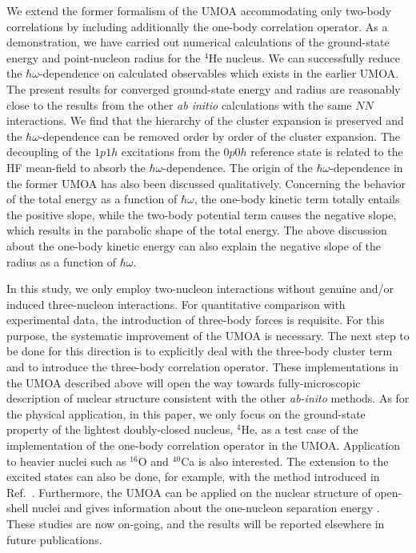 \documentclass[aps,prc, dvips, twocolumn,groupedaddress,showkeys,showpacs,floatfix,superscriptaddress]{revtex4-1}
\newcommand{\<}{\langle}
\renewcommand{\>}{\rangle}
\begin{document}
We extend the former formalism of the UMOA accommodating only two-body correlations
by including additionally the one-body correlation operator.
As a demonstration, we have carried out numerical calculations
of the ground-state energy and point-nucleon radius for the $^{4}$He nucleus.
We can successfully reduce the $\hbar\omega$-dependence on calculated observables which exists in the earlier UMOA.
The present results for converged ground-state energy and radius are reasonably close to the results
from the other {\em ab initio} calculations with the same $NN$ interactions.
We find that the hierarchy of the cluster expansion is preserved
and the $\hbar\omega$-dependence can be removed order by order of the cluster expansion.
The decoupling of the $1p1h$ excitations from the $0p0h$ reference state
 is related to the HF mean-field to absorb the $\hbar\omega$-dependence.
The origin of the $\hbar\omega$-dependence in the former UMOA has also been discussed qualitatively.
Concerning the behavior of the total energy as a function of $\hbar\omega$,
the one-body kinetic term totally entails the positive slope,
while the two-body potential term causes the negative slope,
which results in the parabolic shape of the total energy.
The above discussion about the one-body kinetic energy
can also explain the negative slope of the radius as a function of $\hbar\omega$.

In this study, we only employ two-nucleon interactions without genuine and/or induced three-nucleon interactions.
For quantitative comparison with experimental data, the introduction of three-body forces is requisite.
For this purpose, the systematic improvement of the UMOA is necessary.
The next step to be done for this direction is to explicitly deal with the three-body cluster term
and to introduce the three-body correlation operator.
These implementations in the UMOA described above will open the way towards fully-microscopic description of nuclear structure
consistent with the other {\em ab-inito} methods.
As for the physical application, in this paper, we only focus on the ground-state property of the lightest doubly-closed nucleus, $^4$He,
as a test case of the implementation of the one-body correlation operator in the UMOA.
Application to heavier nuclei such as $^{ 16}$O and $^{40}$Ca is also interested.
The extension to the excited states can also be done, for example, with the method introduced in Ref.~\cite{Fujii:2004}.
Furthermore, the UMOA can be applied on the nuclear structure of open-shell nuclei
and gives information about the one-nucleon separation energy \cite{Fujii:2004, Fujii:2009}.
These studies are now on-going, and the results will be reported elsewhere in future publications.
\end{document}
